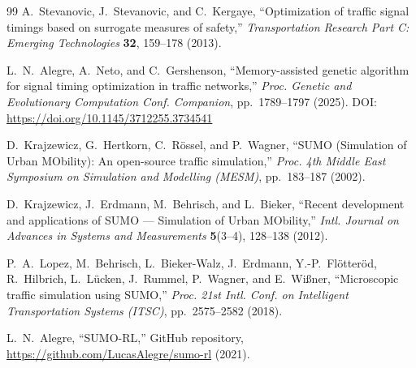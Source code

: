 \documentclass[a4paper,10pt]{article}
\begin{document}
\begin{thebibliography}{99}
		A.~Stevanovic, J.~Stevanovic, and C.~Kergaye,
		``Optimization of traffic signal timings based on surrogate measures of safety,''
		\textit{Transportation Research Part C: Emerging Technologies}
		\textbf{32}, 159--178 (2013).
		
		L.~N.~Alegre, A.~Neto, and C.~Gershenson,
		``Memory-assisted genetic algorithm for signal timing optimization in traffic networks,''
		\textit{Proc. Genetic and Evolutionary Computation Conf. Companion},
		pp.~1789--1797 (2025).
		\newblock DOI: \url{https://doi.org/10.1145/3712255.3734541}
		
		D.~Krajzewicz, G.~Hertkorn, C.~R\"{o}ssel, and P.~Wagner,
		``SUMO (Simulation of Urban MObility): An open-source traffic simulation,''
		\textit{Proc. 4th Middle East Symposium on Simulation and Modelling (MESM)},
		pp.~183--187 (2002).
		
		D.~Krajzewicz, J.~Erdmann, M.~Behrisch, and L.~Bieker,
		``Recent development and applications of SUMO --- Simulation of Urban MObility,''
		\textit{Intl. Journal on Advances in Systems and Measurements}
		\textbf{5}(3--4), 128--138 (2012).
		
		P.~A.~Lopez, M.~Behrisch, L.~Bieker-Walz, J.~Erdmann, Y.-P.~Fl\"{o}tter\"{o}d,
		R.~Hilbrich, L.~L\"{u}cken, J.~Rummel, P.~Wagner, and E.~Wi{\ss}ner,
		``Microscopic traffic simulation using SUMO,''
		\textit{Proc. 21st Intl. Conf. on Intelligent Transportation Systems (ITSC)},
		pp.~2575--2582 (2018).
		
		L.~N.~Alegre,
		``SUMO-RL,'' GitHub repository,
		\url{https://github.com/LucasAlegre/sumo-rl} (2021).
		
	\end{thebibliography}
	
\end{document}
